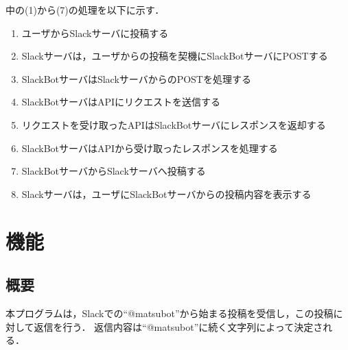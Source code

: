 \documentclass[12pt]{jsarticle}
\begin{document}
 中の(1)から(7)の処理を以下に示す．
\begin{enumerate}
\item ユーザからSlackサーバに投稿する
\item Slackサーバは，ユーザからの投稿を契機にSlackBotサーバにPOSTする
\item SlackBotサーバはSlackサーバからのPOSTを処理する
\item SlackBotサーバはAPIにリクエストを送信する
\item リクエストを受け取ったAPIはSlackBotサーバにレスポンスを返却する
\item SlackBotサーバはAPIから受け取ったレスポンスを処理する
\item SlackBotサーバからSlackサーバへ投稿する
\item Slackサーバは，ユーザにSlackBotサーバからの投稿内容を表示する
\end{enumerate}

\section{機能}\label{sec:function}
\subsection{概要}
本プログラムは，Slackでの``@matsubot''から始まる投稿を受信し，この投稿に対して返信を行う．
返信内容は``@matsubot''に続く文字列によって決定される．
\end{document}
